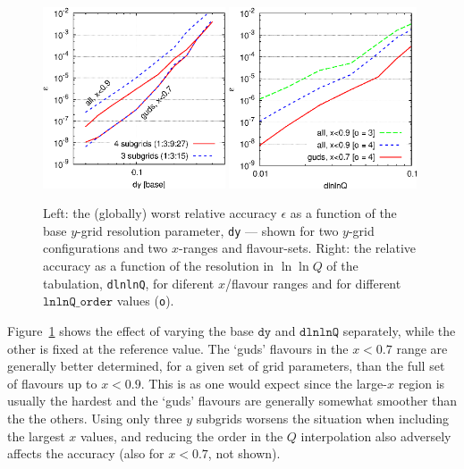 \documentclass[12pt]{article}
\newcommand{\dy}{\ttt{dy}}
\newcommand{\dlnlnQ}{\ttt{dlnlnQ}}
\newcommand{\ttt}[1]{\texttt{#1}}
\begin{document}
\begin{figure}
  \centering
  \includegraphics[width=0.48\textwidth]{../benchmarking/test_acc/dy.eps}%
  \hfill
  \includegraphics[width=0.495\textwidth]{../benchmarking/test_acc/dlnlnQ.eps}%
  \caption{Left: the (globally) worst relative accuracy $\epsilon$ as
    a function of the base $y$-grid resolution parameter, \ttt{dy} ---
    shown for two $y$-grid configurations and two $x$-ranges and
    flavour-sets.  Right: the relative accuracy as a function of the
    resolution in $\ln \ln Q$ of the tabulation, \ttt{dlnlnQ}, for
    diferent $x$/flavour ranges and for different $\ttt{lnlnQ\_order}$
    values (\ttt{o}).}
  \label{fig:dy+dlnlnQ}
\end{figure}

Figure~\ref{fig:dy+dlnlnQ} shows the effect of varying the base $\dy$
and $\dlnlnQ$ separately, while the other is fixed at the reference
value. The `guds' flavours in the $x<0.7$ range are generally better
determined, for a given set of grid parameters, than the full set of
flavours up to $x<0.9$. This is as one would expect since the
large-$x$ region is usually the hardest and the `guds' flavours are
generally somewhat smoother than the the others. Using only three $y$
subgrids worsens the situation when including the largest $x$ values,
and reducing the order in the $Q$ interpolation also adversely affects
the accuracy (also for $x<0.7$, not shown).
\end{document}
